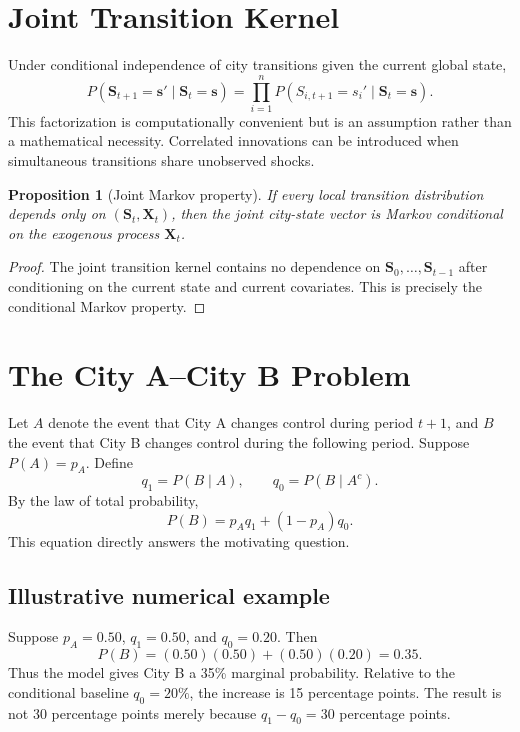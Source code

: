 \documentclass[11pt,letterpaper]{article}
\newtheorem{proposition}{Proposition}
\begin{document}
\section{Joint Transition Kernel}
Under conditional independence of city transitions given the current global state,
\begin{equation}
P(\mathbf{S}_{t+1}=\mathbf{s}'\mid\mathbf{S}_t=\mathbf{s})
=
\prod_{i=1}^{n}P(S_{i,t+1}=s_i'\mid\mathbf{S}_t=\mathbf{s}).
\label{eq:joint-kernel}
\end{equation}
This factorization is computationally convenient but is an assumption rather than a mathematical necessity. Correlated innovations can be introduced when simultaneous transitions share unobserved shocks.

\begin{proposition}[Joint Markov property]
If every local transition distribution depends only on $(\mathbf{S}_t,\mathbf{X}_t)$, then the joint city-state vector is Markov conditional on the exogenous process $\mathbf{X}_t$.
\end{proposition}
\begin{proof}
The joint transition kernel contains no dependence on $\mathbf{S}_0,\ldots,\mathbf{S}_{t-1}$ after conditioning on the current state and current covariates. This is precisely the conditional Markov property.
\end{proof}

\section{The City A--City B Problem}
Let $A$ denote the event that City A changes control during period $t+1$, and $B$ the event that City B changes control during the following period. Suppose $P(A)=p_A$. Define
\begin{equation}
q_1=P(B\mid A),\qquad q_0=P(B\mid A^c).
\end{equation}
By the law of total probability,
\begin{equation}
P(B)=p_Aq_1+(1-p_A)q_0.
\label{eq:total-prob}
\end{equation}
This equation directly answers the motivating question.

\subsection{Illustrative numerical example}
Suppose $p_A=0.50$, $q_1=0.50$, and $q_0=0.20$. Then
\begin{equation}
P(B)=(0.50)(0.50)+(0.50)(0.20)=0.35.
\end{equation}
Thus the model gives City B a 35\% marginal probability. Relative to the conditional baseline $q_0=20\%$, the increase is 15 percentage points. The result is not 30 percentage points merely because $q_1-q_0=30$ percentage points.
\end{document}
